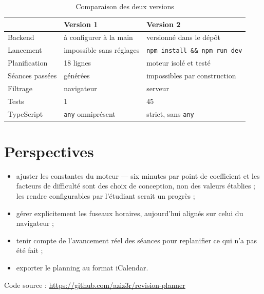 \documentclass[11pt,a4paper]{report}
\begin{document}
\begin{table}[h]
\centering
\begin{tabular}{@{}lll@{}}
\toprule
 & \textbf{Version 1} & \textbf{Version 2} \\
\midrule
Backend          & à configurer à la main      & versionné dans le dépôt \\
Lancement        & impossible sans réglages    & \texttt{npm install \&\& npm run dev} \\
Planification    & 18 lignes                   & moteur isolé et testé \\
Séances passées  & générées                    & impossibles par construction \\
Filtrage         & navigateur                  & serveur \\
Tests            & 1                           & 45 \\
TypeScript       & \texttt{any} omniprésent    & strict, sans \texttt{any} \\
\bottomrule
\end{tabular}
\caption{Comparaison des deux versions}
\end{table}

\section{Perspectives}

\begin{itemize}[nosep]
  \item ajuster les constantes du moteur --- six minutes par point de coefficient
        et les facteurs de difficulté sont des choix de conception, non des
        valeurs établies ; les rendre configurables par l'étudiant serait un
        progrès ;
  \item gérer explicitement les fuseaux horaires, aujourd'hui alignés sur celui du
        navigateur ;
  \item tenir compte de l'avancement réel des séances pour replanifier ce qui n'a
        pas été fait ;
  \item exporter le planning au format iCalendar.
\end{itemize}

\vfill
\begin{center}
\small
Code source : \url{https://github.com/aziz3r/revision-planner}
\end{center}
\end{document}
